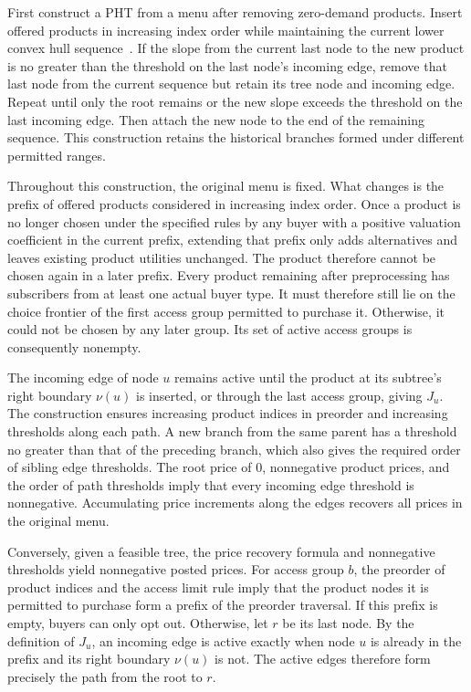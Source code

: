 \begin{IEEEproof}
First construct a PHT from a menu after removing zero-demand products. Insert offered products in increasing index order while maintaining the current lower convex hull sequence~\cite{orig44}. If the slope from the current last node to the new product is no greater than the threshold on the last node's incoming edge, remove that last node from the current sequence but retain its tree node and incoming edge. Repeat until only the root remains or the new slope exceeds the threshold on the last incoming edge. Then attach the new node to the end of the remaining sequence. This construction retains the historical branches formed under different permitted ranges.

Throughout this construction, the original menu is fixed. What changes is the prefix of offered products considered in increasing index order. Once a product is no longer chosen under the specified rules by any buyer with a positive valuation coefficient in the current prefix, extending that prefix only adds alternatives and leaves existing product utilities unchanged. The product therefore cannot be chosen again in a later prefix. Every product remaining after preprocessing has subscribers from at least one actual buyer type. It must therefore still lie on the choice frontier of the first access group permitted to purchase it. Otherwise, it could not be chosen by any later group. Its set of active access groups is consequently nonempty.

The incoming edge of node $u$ remains active until the product at its subtree's right boundary $\nu(u)$ is inserted, or through the last access group, giving $J_u$. The construction ensures increasing product indices in preorder and increasing thresholds along each path. A new branch from the same parent has a threshold no greater than that of the preceding branch, which also gives the required order of sibling edge thresholds. The root price of 0, nonnegative product prices, and the order of path thresholds imply that every incoming edge threshold is nonnegative. Accumulating price increments along the edges recovers all prices in the original menu.

Conversely, given a feasible tree, the price recovery formula and nonnegative thresholds yield nonnegative posted prices. For access group $b$, the preorder of product indices and the access limit rule imply that the product nodes it is permitted to purchase form a prefix of the preorder traversal. If this prefix is empty, buyers can only opt out. Otherwise, let $r$ be its last node. By the definition of $J_u$, an incoming edge is active exactly when node $u$ is already in the prefix and its right boundary $\nu(u)$ is not. The active edges therefore form precisely the path from the root to $r$.


\end{IEEEproof}
